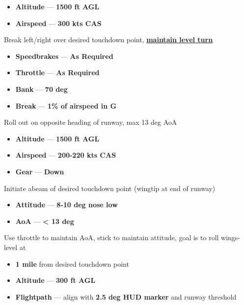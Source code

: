 \begin{checklistenumerate}
    \begin{itemize}
        \item \textbf{Altitude} --- \textbf{1500 ft AGL}
        \item \textbf{Airspeed} --- \textbf{300 kts CAS}
    \end{itemize}
     Break left/right over desired touchdown point, \textbf{\underline{maintain level turn}}

    \begin{itemize}
        \item \textbf{Speedbrakes} --- \textbf{As Required}
        \item \textbf{Throttle} --- \textbf{As Required}
        \item \textbf{Bank} --- \textbf{70 deg}
        \item \textbf{Break} --- \textbf{1\% of airspeed in G}
    \end{itemize}
     Roll out on opposite heading of runway, max 13 deg AoA

    \begin{itemize}
        \item \textbf{Altitude} --- \textbf{1500 ft AGL}
        \item \textbf{Airspeed} --- \textbf{200-220 kts CAS}
        \item \textbf{Gear} --- \textbf{Down}
    \end{itemize}
     Initiate abeam of desired touchdown point (wingtip at end of runway)

    \begin{itemize}
        \item \textbf{Attitude} --- \textbf{8-10 deg nose low}
        \item \textbf{AoA} --- \textbf{< 13 deg}
    \end{itemize}
     Use throttle to maintain AoA, stick to maintain attitude, goal is to roll wings-level at

    \begin{itemize}
        \item \textbf{1 mile} from desired touchdown point
        \item \textbf{Altitude} --- \textbf{300 ft AGL}
        \item \textbf{Flightpath} --- align  with \textbf{2.5 deg HUD marker} and runway threshold
    \end{itemize}
\end{checklistenumerate}

